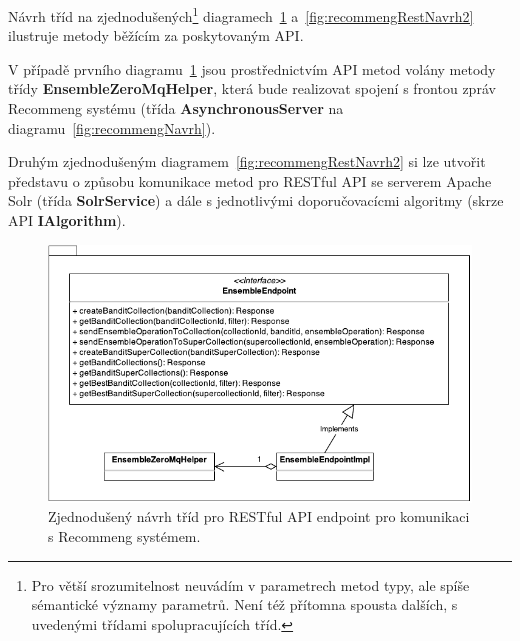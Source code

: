 \documentclass[thesis=M,czech]{FITthesis}[2014/05/07]
\begin{document}
Návrh tříd na zjednodušených\footnote{Pro větší srozumitelnost neuvádím v parametrech metod typy, ale spíše sémantické významy parametrů. Není též přítomna spousta dalších, s uvedenými třídami spolupracujících tříd.} diagramech~\ref{fig:recommengRestNavrh} a~\ref{fig:recommengRestNavrh2} ilustruje metody běžícím za poskytovaným API.

V případě prvního diagramu~\ref{fig:recommengRestNavrh} jsou prostřednictvím API metod volány metody třídy \textbf{EnsembleZeroMqHelper}, která bude realizovat spojení s frontou zpráv Recommeng systému (třída \textbf{AsynchronousServer} na diagramu~\ref{fig:recommengNavrh}).

Druhým zjednodušeným diagramem~\ref{fig:recommengRestNavrh2} si lze utvořit představu o způsobu komunikace metod pro RESTful API se serverem Apache Solr (třída \textbf{SolrService}) a dále s jednotlivými doporučovacícmi algoritmy (skrze API \textbf{IAlgorithm}).

\begin{figure}\centering
	\includegraphics[width=1.0\textwidth]{obr/rest1.pdf}
 	\caption[Zjednodušený návrh tříd pro RESTful API endpoint pro komunikaci s Recommeng systémem.]{Zjednodušený návrh tříd pro RESTful API endpoint pro komunikaci s Recommeng systémem.}\label{fig:recommengRestNavrh}
\end{figure}	
\end{document}

